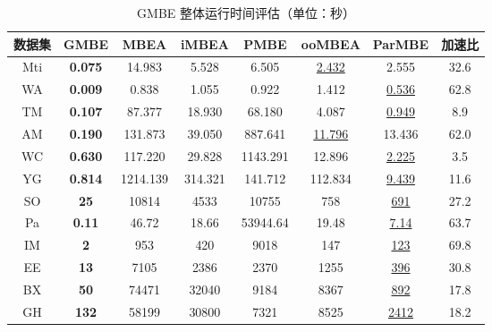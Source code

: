 \begin{table} [t]
	\centering    
	\setlength{\abovecaptionskip}{0cm}  
  \setlength{\belowcaptionskip}{-0.1cm}
	\caption{GMBE 整体运行时间评估（单位：秒）}      
	\label{tbl:gmbe_time}
	\setlength{\tabcolsep}{5pt}
	\begin{center}
				\normalsize{
		\begin{tabular}{|c|c|c|c|c|c|c|c|}
			\hline 

      \textbf{数据集} & \textbf{GMBE} & \textbf{MBEA} & \textbf{iMBEA} & \textbf{PMBE} & \textbf{ooMBEA} & \textbf{ParMBE} & \textbf{加速比} \\ \hline
      Mti & \textbf{0.075} & 14.983 & 5.528 & 6.505 & \uline{2.432} & 2.555 & 32.6 \\
      WA & \textbf{0.009} & 0.838 & 1.055 & 0.922 & 1.412 & \uline{0.536} & 62.8 \\
      TM & \textbf{0.107} & 87.377 & 18.930 & 68.180 & 4.087 & \uline{0.949} & 8.9 \\
      AM & \textbf{0.190} & 131.873 & 39.050 & 887.641 & \uline{11.796} & 13.436 & 62.0 \\
      WC & \textbf{0.630} & 117.220 & 29.828 & 1143.291 & 12.896 & \uline{2.225} & 3.5 \\
      YG & \textbf{0.814} & 1214.139 & 314.321 & 141.712 & 112.834 & \uline{9.439} & 11.6 \\
      SO & \textbf{25} & 10814 & 4533 & 10755 & 758 & \uline{691} & 27.2 \\
      Pa & \textbf{0.11} & 46.72 & 18.66 & 53944.64 & 19.48 & \uline{7.14} & 63.7 \\
      IM & \textbf{2} & 953 & 420 & 9018 & 147 & \uline{123} & 69.8 \\
      EE & \textbf{13} & 7105 & 2386 & 2370 & 1255 & \uline{396} & 30.8 \\
      BX & \textbf{50} & 74471 & 32040 & 9184 & 8367 & \uline{892} & 17.8 \\
      GH & \textbf{132} & 58199 & 30800 & 7321 & 8525 & \uline{2412} & 18.2 \\
      \hline
      
		\end{tabular}
				}
	\end{center}

\end{table}
